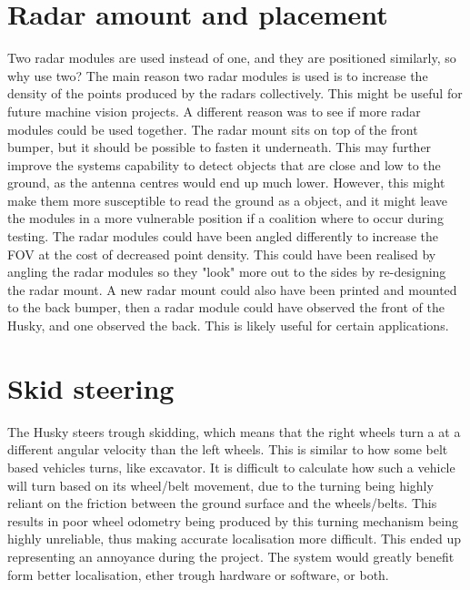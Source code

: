 \section{Radar amount and placement}
Two radar modules are used instead of one, and they are positioned similarly, so why use two? The main reason two radar modules is used is to increase the density of the points produced by the radars collectively. This might be useful for future machine vision projects. A different reason was to see if more radar modules could be used together. The radar mount sits on top of the front bumper, but it should be possible to fasten it underneath. This may further improve the systems capability to detect objects that are close and low to the ground, as the antenna centres would end up much lower. However, this might make them more susceptible to read the ground as a object, and it might leave the modules in a more vulnerable position if a coalition where to occur during testing. The radar modules could have been angled differently to increase the FOV at the cost of decreased point density. This could have been realised by angling the radar modules so they "look" more out to the sides by re-designing the radar mount. A new radar mount could also have been printed and mounted to the back bumper, then a radar module could have observed the front of the Husky, and one observed the back. This is likely useful for certain applications.

\section{Skid steering}
The Husky steers trough skidding, which means that the right wheels turn a at a different angular velocity than the left wheels. This is similar to how some belt based vehicles turns, like excavator. It is difficult to calculate how such a vehicle will turn based on its wheel/belt movement, due to the turning being highly reliant on the friction between the ground surface and the wheels/belts. This results in poor wheel odometry being produced by this turning mechanism being highly unreliable, thus making accurate localisation more difficult. This ended up representing an annoyance during the project. The system would greatly benefit form better localisation, ether trough hardware or software, or both.